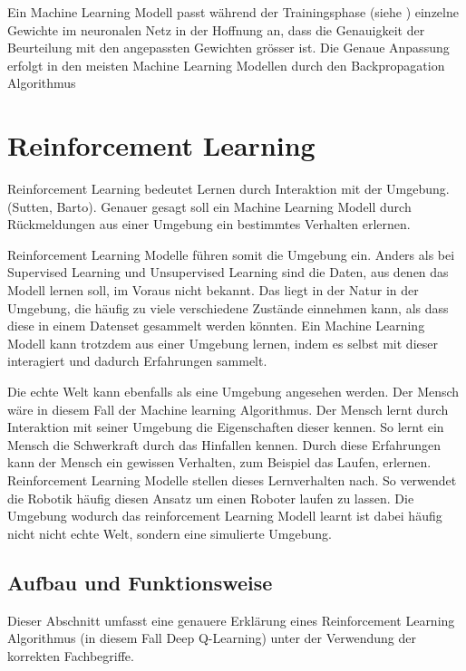 Ein Machine Learning Modell passt während der Trainingsphase (siehe
) einzelne Gewichte im neuronalen Netz in der
Hoffnung an, dass die Genauigkeit der Beurteilung mit den angepassten Gewichten
grösser ist. Die Genaue Anpassung erfolgt in den meisten Machine Learning
Modellen durch den Backpropagation Algorithmus



\section{Reinforcement Learning}
\label{chap:t_rl}
Reinforcement Learning bedeutet Lernen durch Interaktion mit der Umgebung.
(Sutten, Barto). Genauer gesagt soll ein Machine Learning Modell durch
Rückmeldungen aus einer Umgebung ein bestimmtes Verhalten erlernen.

Reinforcement Learning Modelle führen somit die Umgebung ein. Anders als bei
Supervised Learning und Unsupervised Learning sind die Daten, aus denen das
Modell lernen soll, im Voraus nicht bekannt. Das liegt in der Natur in der
Umgebung, die häufig zu viele verschiedene Zustände einnehmen kann, als dass
diese in einem Datenset gesammelt werden könnten. Ein Machine Learning Modell
kann trotzdem aus einer Umgebung lernen, indem es selbst mit dieser interagiert
und dadurch Erfahrungen sammelt. 

Die echte Welt kann ebenfalls als eine Umgebung angesehen werden. Der Mensch
wäre in diesem Fall der Machine learning Algorithmus. Der Mensch lernt durch
Interaktion mit seiner Umgebung die Eigenschaften dieser kennen. So lernt ein
Mensch die Schwerkraft durch das Hinfallen kennen. Durch diese Erfahrungen kann
der Mensch ein gewissen Verhalten, zum Beispiel das Laufen, erlernen.
Reinforcement Learning Modelle stellen dieses Lernverhalten nach. So verwendet
die Robotik häufig diesen Ansatz um einen Roboter laufen zu lassen. Die Umgebung
wodurch das reinforcement Learning Modell learnt ist dabei häufig nicht nicht
echte Welt, sondern eine simulierte Umgebung.



\subsection*{Aufbau und Funktionsweise}
Dieser Abschnitt umfasst eine genauere Erklärung eines Reinforcement Learning
Algorithmus (in diesem Fall Deep Q-Learning) unter der Verwendung der korrekten
Fachbegriffe.

